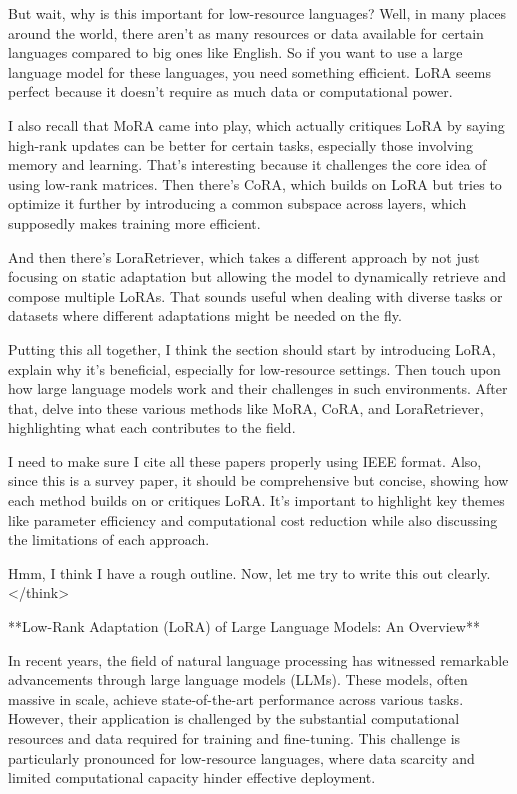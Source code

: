 \documentclass[conference]{IEEEtran}
\begin{document}
But wait, why is this important for low-resource languages? Well, in many places around the world, there aren't as many resources or data available for certain languages compared to big ones like English. So if you want to use a large language model for these languages, you need something efficient. LoRA seems perfect because it doesn’t require as much data or computational power.

I also recall that MoRA came into play, which actually critiques LoRA by saying high-rank updates can be better for certain tasks, especially those involving memory and learning. That's interesting because it challenges the core idea of using low-rank matrices. Then there's CoRA, which builds on LoRA but tries to optimize it further by introducing a common subspace across layers, which supposedly makes training more efficient.

And then there's LoraRetriever, which takes a different approach by not just focusing on static adaptation but allowing the model to dynamically retrieve and compose multiple LoRAs. That sounds useful when dealing with diverse tasks or datasets where different adaptations might be needed on the fly.

Putting this all together, I think the section should start by introducing LoRA, explain why it's beneficial, especially for low-resource settings. Then touch upon how large language models work and their challenges in such environments. After that, delve into these various methods like MoRA, CoRA, and LoraRetriever, highlighting what each contributes to the field.

I need to make sure I cite all these papers properly using IEEE format. Also, since this is a survey paper, it should be comprehensive but concise, showing how each method builds on or critiques LoRA. It's important to highlight key themes like parameter efficiency and computational cost reduction while also discussing the limitations of each approach.

Hmm, I think I have a rough outline. Now, let me try to write this out clearly.
</think>

**Low-Rank Adaptation (LoRA) of Large Language Models: An Overview**

In recent years, the field of natural language processing has witnessed remarkable advancements through large language models (LLMs). These models, often massive in scale, achieve state-of-the-art performance across various tasks. However, their application is challenged by the substantial computational resources and data required for training and fine-tuning. This challenge is particularly pronounced for low-resource languages, where data scarcity and limited computational capacity hinder effective deployment.
\end{document}

